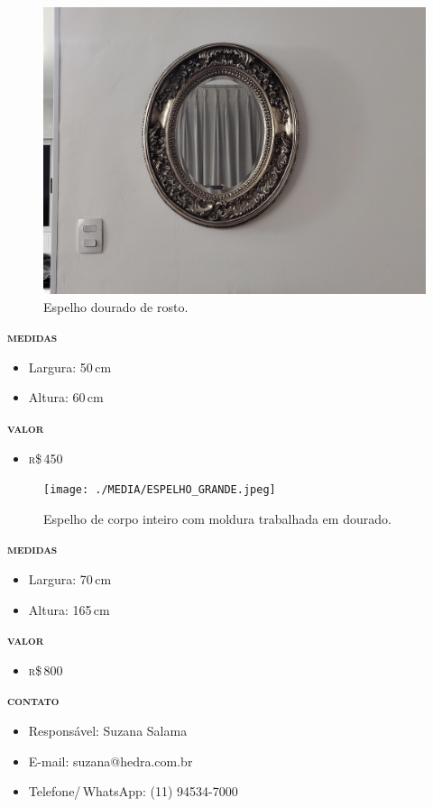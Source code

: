 \pagebreak

\begin{figure}[htpb!]
\includegraphics[width=\textwidth]{./MEDIA/ESPELHO_PEQUENO.jpeg}
\caption{Espelho dourado de rosto.}
\end{figure}
\noindent\textsc{\textbf{medidas}}
\begin{itemize}
\item Largura: 50\,cm
\item Altura: 60\,cm
\end{itemize}
\noindent\textsc{\textbf{valor}}
\begin{itemize}
\item \textsc{r}\$\,450
\end{itemize}

\pagebreak

\begin{figure}[htpb!]
\begin{center}
\texttt{[image: ./MEDIA/ESPELHO\_GRANDE.jpeg]}
\caption{Espelho de corpo inteiro com moldura trabalhada em dourado.}
\end{center}
\end{figure}
\noindent\textsc{\textbf{medidas}}
\begin{itemize}
\item Largura: 70\,cm
\item Altura: 165\,cm
\end{itemize}
\noindent\textsc{\textbf{valor}}
\begin{itemize}
\item \textsc{r}\$\,800
\end{itemize}

\pagebreak

\mbox{}

\vfill

\noindent\textsc{\textbf{contato}}

\begin{itemize}
\item Responsável: Suzana Salama
\item E-mail: suzana@hedra.com.br
\item Telefone/\,WhatsApp: (11) 94534-7000
\end{itemize}

\endgroup
\pagebreak